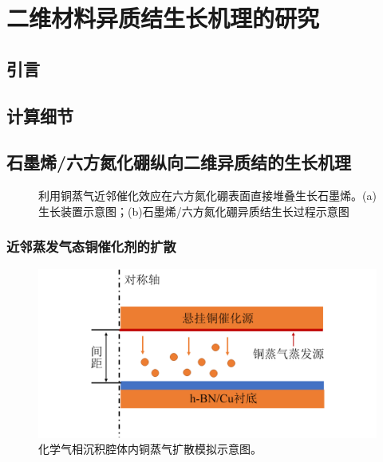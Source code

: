 \chapter{二维材料异质结生长机理的研究}
\section{引言}
\section{计算细节}
\section{石墨烯/六方氮化硼纵向二维异质结的生长机理}

    \begin{figure}[htb]
        \newline
        \caption{利用铜蒸气近邻催化效应在六方氮化硼表面直接堆叠生长石墨烯。(a)生长装置示意图；(b)石墨烯/六方氮化硼异质结生长过程示意图}
        \label{fig:CG_diagram_CVD}
    \end{figure}

    \subsection{近邻蒸发气态铜催化剂的扩散}
    
    \begin{figure}[htb]
        \includegraphics{pic/CG_diagram_FEM_structure.png}
        \caption{化学气相沉积腔体内铜蒸气扩散模拟示意图。}
        \label{fig:CG_diagram_FEM_structure}
    \end{figure}

